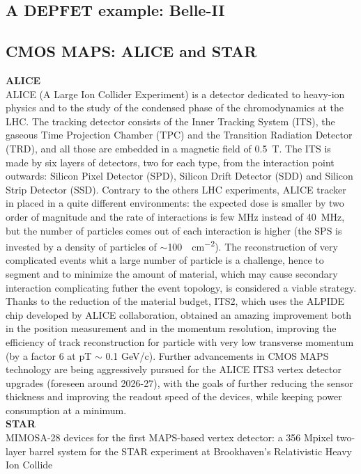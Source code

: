     \subsection{A DEPFET example: Belle-II}

    \subsection{CMOS MAPS: ALICE and STAR}
        \textbf{ALICE}\\
        ALICE (A Large Ion Collider Experiment) is a detector dedicated to heavy-ion physics and to the study of the condensed phase of the chromodynamics at the LHC.
        The tracking detector consists of the Inner Tracking System (ITS), the gaseous Time Projection Chamber (TPC) and the Transition Radiation Detector (TRD),  and all those are embedded in a magnetic field of \SI{0.5}{T}. The ITS is made by six layers of detectors, two for each type, from the interaction point outwards: Silicon Pixel Detector (SPD), Silicon Drift Detector (SDD) and Silicon Strip Detector (SSD).         
        Contrary to the others LHC experiments, ALICE tracker in placed in a quite different environments: the expected dose is smaller by two order of magnitude and the rate of interactions is few \si{MHz} instead of \SI{40}{MHz}, but the number of particles comes out of each interaction is higher (the SPS is invested by a density of particles of $\sim$\SI{100}{\per cm\tothe{-2}}).  
        The reconstruction of very complicated events whit a large number of particle is a challenge, hence to segment and to minimize the amount of material, which may cause secondary interaction complicating futher the event topology, is considered a viable strategy. 
        Thanks to the reduction of the material budget, ITS2, which uses the ALPIDE chip developed by ALICE collaboration, obtained an amazing improvement both in the position measurement and in the momentum resolution, improving the efficiency of track reconstruction for particle with very low transverse momentum (by a factor 6 at pT $\sim$ 0.1 GeV/c). Further advancements in CMOS MAPS technology are being aggressively pursued for the ALICE ITS3 vertex detector upgrades (foreseen around 2026-27), with the goals of further reducing the sensor thickness and improving the readout speed of the devices, while keeping power consumption at a minimum.\\
        \vspace{5mm}
        \textbf{STAR}\\
        MIMOSA-28 devices for the first MAPS-based vertex detector: a 356 Mpixel two-layer barrel system for the STAR experiment at Brookhaven’s Relativistic Heavy Ion Collide
